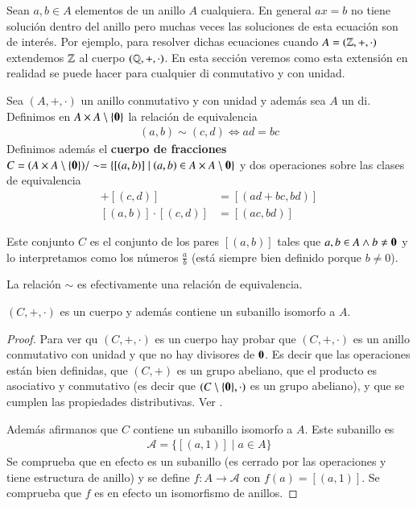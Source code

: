 Sean $a,b \in A$ elementos de un anillo $A$ cualquiera. En general $ax = b$ no tiene solución dentro del anillo pero muchas veces las soluciones de esta ecuación son de interés. Por ejemplo, para resolver dichas ecuaciones cuando $A = (\mathbb{Z}, +, \cdot)$ extendemos $\mathbb{Z}$ al cuerpo $(\mathbb{Q}, +, \cdot)$. En esta sección veremos como esta extensión en realidad se puede hacer para cualquier \gls{di} conmutativo y con unidad.

\begin{dfn}
	Sea $(A, +, \cdot)$ un anillo conmutativo y con unidad y además sea $A$ un \gls{di}. Definimos en $A \times A\setminus\{\mathbf{0}\}$ la relación de equivalencia
	\begin{align}
		(a,b) \sim (c,d) \iff ad = bc
	\end{align}
	Definimos además el \textbf{cuerpo de fracciones} $C = (A\times A\setminus \{\mathbf{0}\})/ \sim = \{[(a,b)] \mid (a,b) \in A\times A\setminus \mathbf{0}\}$ y dos operaciones sobre las clases de equivalencia
	\begin{align}
		[(a,b)]+[(c,d)] &= [(ad+bc, bd)] \\
		[(a,b)]\cdot[(c,d)] &= [(ac,bd)]
	\end{align}
\end{dfn}

Este conjunto $C$ es el conjunto de los pares $[(a,b)]$ tales que $a,b \in A \land b \neq \mathbf{0}$ y lo interpretamos como los números $\frac{a}{b}$ (está siempre bien definido porque $b \neq 0$).

\begin{pro}
	La relación $\sim$ es efectivamente una relación de equivalencia.
\end{pro}

\begin{thm}
	$(C, +, \cdot)$ es un cuerpo y además contiene un subanillo isomorfo a $A$.
\end{thm}

\begin{proof}
	Para ver qu $(C, +, \cdot)$ es un cuerpo hay probar que $(C, +, \cdot)$ es un anillo conmutativo con unidad y que no hay divisores de $\mathbf{0}$. Es decir que las operaciones están bien definidas, que $(C,+)$ es un grupo abeliano, que el producto es asociativo y conmutativo (es decir que $(C\setminus \{\mathbf{0}\}, \cdot)$ es un grupo abeliano), y que se cumplen las propiedades distributivas. Ver \cite[p.209]{dor96}.
	
	Además afirmanos que $C$ contiene un subanillo isomorfo a $A$. Este subanillo es
	\begin{align*}
		\mathcal{A} = \{[(a, 1)] \mid a \in A\}
	\end{align*}
	Se comprueba que en efecto es un subanillo (es cerrado por las operaciones y tiene estructura de anillo) y se define $f:A \to \mathcal{A}$ con $f(a) = [(a, 1)]$. Se comprueba que $f$ es en efecto un isomorfismo de anillos.
\end{proof}

